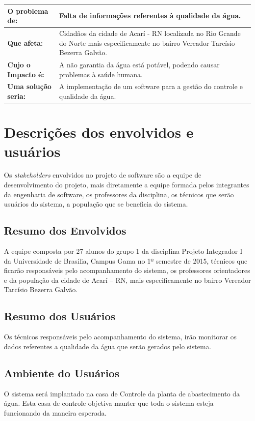 \begin{table}[!h]
\centering
\begin{tabular}{|p{4cm}|p{10cm}|}\hline
\textbf{O problema de:}&Falta de informações referentes à qualidade da água.\\ \hline
\textbf{Que afeta:}&Cidadãos da cidade de Acarí - RN localizada no Rio Grande do Norte mais especificamente no bairro Vereador Tarcísio Bezerra Galvão.\\ \hline
\textbf{Cujo o Impacto é:}&A não garantia da água está potável, podendo causar problemas à saúde humana.\\ \hline
\textbf{Uma solução seria:}&	A implementação de um software para a gestão do controle e qualidade da água.\\ \hline
\end{tabular}
\end{table}

\section*{Descrições dos envolvidos e usuários}
Os \emph{stakeholders} envolvidos no projeto de software são a equipe de desenvolvimento do projeto, mais diretamente a equipe formada pelos integrantes da engenharia de software, os professores da disciplina, os técnicos que serão usuários do sistema, a população que se beneficia do sistema.

\subsection*{Resumo dos Envolvidos}
A equipe composta por 27 alunos do grupo 1 da disciplina Projeto Integrador I da Universidade de Brasília, Campus Gama no 1º semestre de 2015, técnicos que ficarão responsáveis pelo acompanhamento do sistema, os professores orientadores e da população da cidade de Acarí – RN, mais especificamente no bairro Vereador Tarcísio Bezerra Galvão.

\subsection*{Resumo dos Usuários}
Os técnicos responsáveis pelo acompanhamento do sistema, irão monitorar os dados referentes a qualidade da água que serão gerados pelo sistema.

\subsection*{Ambiente do Usuários}
O sistema será implantado na casa  de Controle da planta de abastecimento da água. Esta casa de controle objetiva manter que toda o sistema esteja funcionando da maneira esperada.

